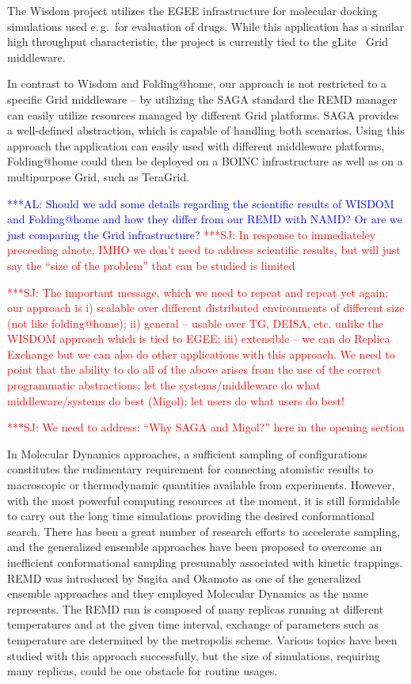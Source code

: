\documentclass[times, 10pt,twocolumn]{article}
\newcommand{\alnote}[1]{ {\textcolor{blue} { ***AL: #1 }}}
\newcommand{\jhanote}[1]{ {\textcolor{red} { ***SJ: #1 }}}
\newcommand{\alnote}[1]{}
\newcommand{\jhanote}[1]{}
\begin{document}
The Wisdom project utilizes the EGEE infrastructure for molecular
docking simulations used e.\,g.\ for evaluation of drugs. While this
application has a similar high throughput characteristic, the project
is currently tied to the gLite~\cite{glite2008} Grid middleware.

In contrast to Wisdom and Folding@home, our approach is not restricted
to a specific Grid middleware -- by utilizing the SAGA standard the
REMD manager can easily utilize resources managed by different Grid
platforms. SAGA provides a well-defined abstraction, which is capable
of handling both scenarios. Using this approach the application can
easily used with different middleware platforms, Folding@home could
then be deployed on a BOINC infrastructure as well as on a
multipurpose Grid, such as TeraGrid.

\alnote{Should we add some details regarding the scientific results of
  WISDOM and Folding@home and how they differ from our REMD with NAMD?
  Or are we just comparing the Grid infrastructure?}  \jhanote{In
  response to immediateley preceeding alnote, IMHO we don't need to
  address scientific results, but will just say the ``size of the
  problem'' that can be studied is limited}

  \jhanote{The important message, which we need to repeat and repeat
    yet again: our approach is i) scalable over different distributed
    environments of different size (not like folding@home); ii)
    general -- usable over TG, DEISA, etc. unlike the WISDOM approach
    which is tied to EGEE; iii) extensible -- we can do Replica
    Exchange but we can also do other applications with this
    approach. We need to point that the ability to do all of the above
    arises from the use of the correct programmatic abstractions; let
    the systems/middleware do what middleware/systems do best (Migol);
    let users do what users do best!}

  \jhanote{We need to address: ``Why SAGA and Migol?'' here in the
    opening section}



In Molecular Dynamics approaches, a sufficient sampling of
configurations constitutes the rudimentary requirement for connecting
atomistic results to macroscopic or thermodynamic quantities available
from experiments.  However, with the most powerful computing resources
at the moment, it is still formidable to carry out the long time
simulations providing the desired conformational search.  There has
been a great number of research efforts to accelerate sampling, and
the generalized ensemble approaches have been proposed to overcome an
inefficient conformational sampling presumably associated with kinetic
trappings.  REMD was introduced by Sugita and Okamoto as one of the
generalized ensemble approaches and they employed Molecular Dynamics
as the name represents.  The REMD run is composed of many replicas
running at different temperatures and at the given time interval,
exchange of parameters such as temperature are determined by the
metropolis scheme.  Various topics have been studied with this
approach successfully, but the size of simulations, requiring many
replicas, could be one obstacle for routine usages.  
\end{document}
